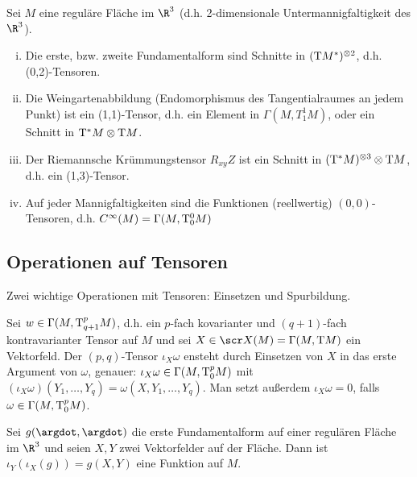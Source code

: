 \begin{ex*}
    Sei $M$ eine reguläre Fläche im $\R^3$ (d.h. 2-dimensionale Untermannigfaltigkeit des $\R^3$).
    \begin{enumerate}[(i)]
        \item
            Die erste, bzw. zweite Fundamentalform sind Schnitte in $(\mathrm{T} M^*)^{\otimes 2}$, d.h. (0,2)-Tensoren.
        \item
            Die Weingartenabbildung (Endomorphismus des Tangentialraumes an jedem Punkt) ist ein (1,1)-Tensor, d.h. ein Element in $\Gamma(M, T_1^1 M)$, oder ein Schnitt in $\mathrm{T}^* M \otimes \mathrm{T} M$.
        \item
            Der Riemannsche Krümmungstensor $R_{xy} Z$ ist ein Schnitt in $(\mathrm{T}^* M)^{\otimes 3} \otimes \mathrm{T} M$, d.h. ein (1,3)-Tensor.
        \item
            Auf jeder Mannigfaltigkeiten sind die Funktionen (reellwertig) $(0,0)$-Tensoren, d.h. $C^\infty(M) = \Gamma(M, \mathrm{T}_0^0 M)$
    \end{enumerate}
\end{ex*}


\subsection{Operationen auf Tensoren}

Zwei wichtige Operationen mit Tensoren: Einsetzen und Spurbildung.

\begin{df} \label{5.15}
    Sei $w \in \Gamma(M, \mathrm{T}^p_{q+1} M)$, d.h. ein $p$-fach kovarianter und $(q+1)$-fach kontravarianter Tensor auf $M$ und sei $X \in \scr X(M) = \Gamma(M, \T M)$ ein Vektorfeld.
    Der $(p,q)$-Tensor $\iota_X \omega$ ensteht durch Einsetzen von $X$  in das erste Argument von $\omega$, genauer: $\iota_X \omega \in \Gamma(M, \mathrm{T}_0^p M)$ mit
    \begin{math}
        (\iota_X \omega)(Y_1, \dotsc, Y_q) = \omega(X, Y_1, \dotsc, Y_q).
    \end{math}
    Man setzt außerdem $\iota_X \omega = 0$, falls $\omega \in \Gamma(M, \mathrm{T}_0^p M)$.
\end{df}

\begin{ex*}
    Sei $g(\argdot, \argdot)$ die erste Fundamentalform auf einer regulären Fläche im $\R^3$ und seien $X, Y$ zwei Vektorfelder auf der Fläche.
    Dann ist $\iota_Y(\iota_X(g)) = g(X,Y)$ eine Funktion auf $M$.
\end{ex*}

